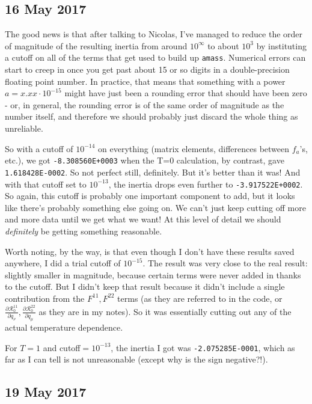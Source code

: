 \subsection*{16 May 2017}

The good news is that after talking to Nicolas, I've managed to reduce the order of magnitude of the resulting inertia from around $10^\infty$ to about $10^3$ by instituting a cutoff on all of the terms that get used to build up \verb|amass|. Numerical errors can start to creep in once you get past about 15 or so digits in a double-precision floating point number. In practice, that means that something with a power $a=x.xx\cdot10^{-15}$ might have just been a rounding error that should have been zero - or, in general, the rounding error is of the same order of magnitude as the number itself, and therefore we should probably just discard the whole thing as unreliable.

So with a cutoff of $10^{-14}$ on everything (matrix elements, differences between $f_a$'s, etc.), we got \verb|-8.308560E+0003| when the T=0 calculation, by contrast, gave \verb|1.618428E-0002|. So not perfect still, definitely. But it's better than it was! And with that cutoff set to $10^{-13}$, the inertia drops even further to \verb|-3.917522E+0002|. So again, this cutoff is probably one important component to add, but it looks like there's probably something else going on. We can't just keep cutting off more and more data until we get what we want! At this level of detail we should \textit{definitely} be getting something reasonable.

Worth noting, by the way, is that even though I don't have these results saved anywhere, I did a trial cutoff of $10^{-15}$. The result was very close to the real result: slightly smaller in magnitude, because certain terms were never added in thanks to the cutoff. But I didn't keep that result because it didn't include a single contribution from the $F^{11}, F^{22}$ terms (as they are referred to in the code, or $\frac{\partial\mathcal{R}^{11}_{0}}{\partial q_\nu}, \frac{\partial\mathcal{R}^{22}_{0}}{\partial q_\mu}$ as they are in my notes). So it was essentially cutting out any of the actual temperature dependence.

For $T=1$ and cutoff$=10^{-13}$, the inertia I got was \verb|-2.075285E-0001|, which as far as I can tell is not unreasonable (except why is the sign negative?!).

\subsection*{19 May 2017}

